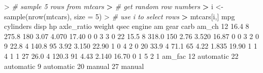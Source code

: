 \documentclass[
]{book}
\newenvironment{Shaded}{\begin{snugshade}}{\end{snugshade}}
\newcommand{\AttributeTok}[1]{\textcolor[rgb]{0.77,0.63,0.00}{#1}}
\newcommand{\CommentTok}[1]{\textcolor[rgb]{0.56,0.35,0.01}{\textit{#1}}}
\newcommand{\DecValTok}[1]{\textcolor[rgb]{0.00,0.00,0.81}{#1}}
\newcommand{\ErrorTok}[1]{\textcolor[rgb]{0.64,0.00,0.00}{\textbf{#1}}}
\newcommand{\FloatTok}[1]{\textcolor[rgb]{0.00,0.00,0.81}{#1}}
\newcommand{\FunctionTok}[1]{\textcolor[rgb]{0.00,0.00,0.00}{#1}}
\newcommand{\NormalTok}[1]{#1}
\newcommand{\OtherTok}[1]{\textcolor[rgb]{0.56,0.35,0.01}{#1}}
\newcommand{\SpecialCharTok}[1]{\textcolor[rgb]{0.00,0.00,0.00}{#1}}
\begin{document}
\begin{Shaded}
\begin{Highlighting}[]
\SpecialCharTok{\textgreater{}} \CommentTok{\# sample 5 rows from mtcars}
\ErrorTok{\textgreater{}} \CommentTok{\# get random row numbers}
\ErrorTok{\textgreater{}}\NormalTok{ i }\OtherTok{\textless{}{-}} \FunctionTok{sample}\NormalTok{(}\FunctionTok{nrow}\NormalTok{(mtcars), }\AttributeTok{size =} \DecValTok{5}\NormalTok{)}
\SpecialCharTok{\textgreater{}} \CommentTok{\# use i to select rows}
\ErrorTok{\textgreater{}}\NormalTok{ mtcars[i,]}
\NormalTok{    mpg cylinders  disp  hp axle\_ratio weight  qsec engine am gear carb am\_ch}
\DecValTok{12} \FloatTok{16.4}         \DecValTok{8} \FloatTok{275.8} \DecValTok{180}       \FloatTok{3.07}  \FloatTok{4.070} \FloatTok{17.40}      \DecValTok{0}  \DecValTok{0}    \DecValTok{3}    \DecValTok{3}     \DecValTok{0}
\DecValTok{22} \FloatTok{15.5}         \DecValTok{8} \FloatTok{318.0} \DecValTok{150}       \FloatTok{2.76}  \FloatTok{3.520} \FloatTok{16.87}      \DecValTok{0}  \DecValTok{0}    \DecValTok{3}    \DecValTok{2}     \DecValTok{0}
\DecValTok{9}  \FloatTok{22.8}         \DecValTok{4} \FloatTok{140.8}  \DecValTok{95}       \FloatTok{3.92}  \FloatTok{3.150} \FloatTok{22.90}      \DecValTok{1}  \DecValTok{0}    \DecValTok{4}    \DecValTok{2}     \DecValTok{0}
\DecValTok{20} \FloatTok{33.9}         \DecValTok{4}  \FloatTok{71.1}  \DecValTok{65}       \FloatTok{4.22}  \FloatTok{1.835} \FloatTok{19.90}      \DecValTok{1}  \DecValTok{1}    \DecValTok{4}    \DecValTok{1}     \DecValTok{1}
\DecValTok{27} \FloatTok{26.0}         \DecValTok{4} \FloatTok{120.3}  \DecValTok{91}       \FloatTok{4.43}  \FloatTok{2.140} \FloatTok{16.70}      \DecValTok{0}  \DecValTok{1}    \DecValTok{5}    \DecValTok{2}     \DecValTok{1}
\NormalTok{      am\_fac}
\DecValTok{12}\NormalTok{ automatic}
\DecValTok{22}\NormalTok{ automatic}
\DecValTok{9}\NormalTok{  automatic}
\DecValTok{20}\NormalTok{    manual}
\DecValTok{27}\NormalTok{    manual}
\end{Highlighting}
\end{Shaded}
\end{document}

